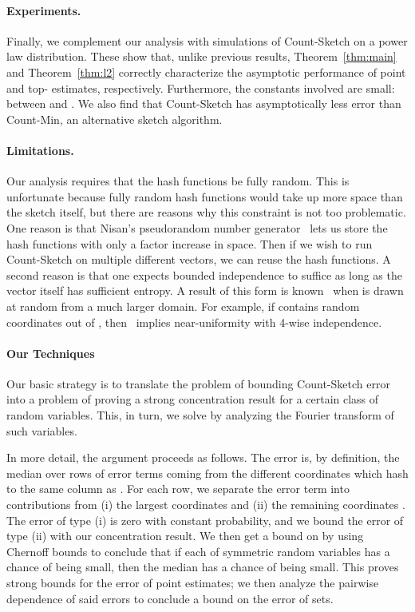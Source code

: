 \documentclass[letterpaper,11pt]{article}
\begin{document}
\paragraph{Experiments.}
Finally, we complement our analysis with simulations of Count-Sketch
on a power law distribution.  These show that, unlike previous results,
Theorem~\ref{thm:main} and Theorem~\ref{thm:l2} correctly characterize
the asymptotic performance of point and top- estimates,
respectively.  Furthermore, the constants involved are small:
between  and .  We also find that Count-Sketch has
asymptotically less error than Count-Min, an alternative sketch
algorithm.

\paragraph{Limitations.}
Our analysis requires that the hash functions be fully random.
This is unfortunate because fully random hash functions would
take up more space than the sketch itself, but there are reasons
why this constraint is not too problematic.  One reason is that
Nisan's pseudorandom number generator~\cite{N92} lets us store the
hash
functions with only a  factor increase in space.  Then
if we wish to run Count-Sketch on multiple different vectors, we can reuse
the hash functions.
A second reason is that one expects bounded independence to suffice
as long as the vector  itself has sufficient entropy.  A result of
this form is known~\cite{MV10} when  is drawn at random from
a much larger domain.  For example, if  contains 
random coordinates out of , then~\cite{MV10} implies
near-uniformity with 4-wise independence.


\paragraph{Our Techniques}  
Our basic strategy is to translate the problem of bounding
Count-Sketch error into a problem of proving a strong concentration
result for a certain class of random variables.  This, in
turn, we solve by analyzing the Fourier transform of such variables.

In more detail, the argument proceeds as follows.  The error
 is, by definition, the median over rows of
error terms coming from the different coordinates which hash
to the same column as .  For each row, we separate the error term
into contributions from (i) the largest  coordinates 
and (ii) the remaining coordinates .
The error of type (i) is zero with constant probability, and
we bound the error of type (ii) with our concentration result.
We then get a bound on  by using Chernoff bounds
to conclude that if each of  symmetric random variables has a 
chance of being small, then the median has a  chance of being small.
This proves strong bounds for the error of point estimates;
we then analyze the pairwise dependence of said errors to
conclude a bound on the error of sets.
\end{document}
